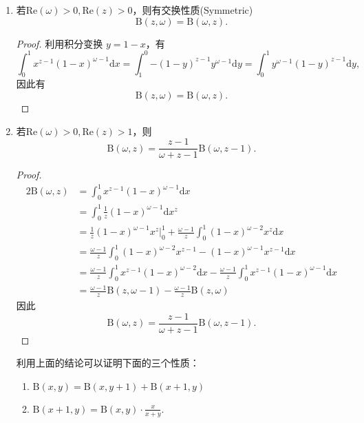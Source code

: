 \begin{property}
\begin{enumerate}[noitemsep]
		\item 若$\mathrm{Re}\left(\omega\right)>0,\mathrm{Re}\left(z\right)>0$，则有交换性质(Symmetric)
		\begin{equation}
		\mathrm{B}\left(z,\omega\right)= \mathrm{B}\left(\omega,z\right).
		\end{equation}
		\begin{proof}
			利用积分变换 $y = 1-x$，有
			$$\int_{0}^{1}{x^{z-1}\left(1-x\right)^{\omega-1}\mathrm{d}x} = \int_{1}^{0}{-\left(1-y\right)^{z-1}y^{\omega-1}\mathrm{d}y} = \int_{0}^{1}{y^{\omega-1}\left(1-y\right)^{z-1}\mathrm{d}y},$$
			因此有$$\mathrm{B}\left(z,\omega\right)= \mathrm{B}\left(\omega,z\right).$$
		\end{proof}
		\item 若$\mathrm{Re}\left(\omega\right)>0,\mathrm{Re}\left(z\right)>1$，则
		\begin{equation}
		\mathrm{B}\left(\omega,z\right)=  \frac{z-1}{\omega+z-1}\mathrm{B}\left(\omega,z-1\right).
		\end{equation}
		\begin{proof}
			\begin{alignat*}{2}
			\mathrm{B}\left(\omega,z\right) & = \int_{0}^{1}{x^{z-1}\left(1-x\right)^{\omega-1}\mathrm{d}x}\\
			& = \int_{0}^{1}\frac{1}{z}\left(1-x\right)^{\omega-1}\mathrm{d}x^z \\
			& = \frac{1}{z}\left(1-x\right)^{\omega-1}x^z\Big|^1_0 + \frac{\omega-1}{z} \int_{0}^{1}\left(1-x\right)^{\omega-2}x^z \mathrm{d}x \\
			& =  \frac{\omega-1}{z} \int_{0}^{1}\left(1-x\right)^{\omega-2}x^{z-1} - \left(1-x\right)^{\omega-1}x^{z-1}\mathrm{d}x \\
			& = \frac{\omega-1}{z} \int_{0}^{1}{x^{z-1}\left(1-x\right)^{\omega-2}\mathrm{d}x}-\frac{\omega-1}{z}\int_{0}^{1}{x^{z-1}\left(1-x\right)^{\omega-1}\mathrm{d}x} \\
			& = \frac{\omega-1}{z}\mathrm{B}\left(z,\omega-1\right)-\frac{\omega-1}{z}\mathrm{B}\left(z,\omega\right) 
			\end{alignat*}
			因此$$\mathrm{B}\left(\omega,z\right)=  \frac{z-1}{\omega+z-1}\mathrm{B}\left(\omega,z-1\right).$$
		\end{proof}
		利用上面的结论可以证明下面的三个性质：
		\begin{enumerate}[noitemsep]
			\item $\displaystyle \mathrm{B}\left(x,y\right) =  \mathrm{B}\left(x,y+1\right)+ \mathrm{B}\left(x+1,y\right)$
			\item $\displaystyle \mathrm{B}\left(x+1,y\right) = \mathrm{B}\left(x,y\right)\cdot \frac{x}{x+y}.$

\end{enumerate}
\end{enumerate}
\end{property}
